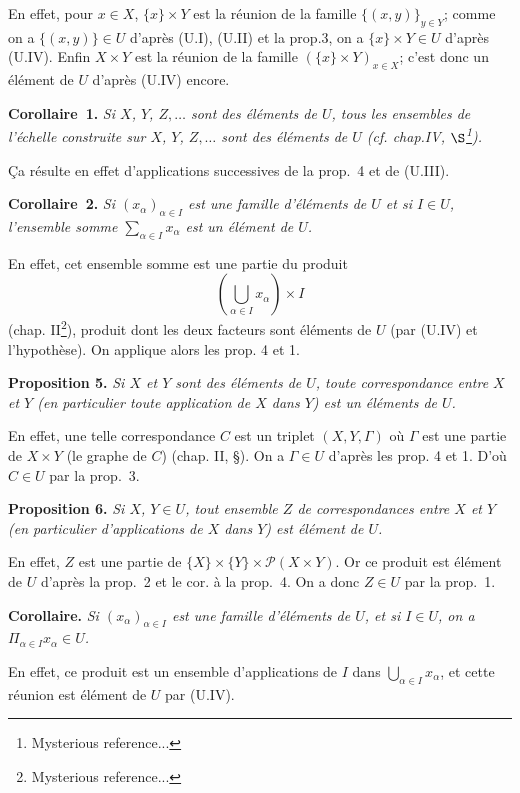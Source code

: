 \documentclass[12pt]{article}
\newcommand{\nn}{\noindent}
\begin{document}
En effet, pour $x\in X$, $\{x\}\times Y$ est la réunion de la famille $\{(x,y)\}_{y\in Y}$; comme on a $\{(x,y)\}\in U$ d'après (U.I), (U.II) et la prop.3, on a $\{x\}\times Y\in U$ d'après (U.IV). Enfin $X\times Y$ est la réunion de la famille $(\{x\}\times Y)_{x\in X}$; c'est donc un élément de $U$ d'après (U.IV) encore.

\nn\textbf{Corollaire~1.} \emph{Si $X$, $Y$, $Z,\ldots$ sont des éléments de $U$, tous les ensembles de l'échelle construite sur $X$, $Y$, $Z,\ldots$ sont des éléments de $U$ (cf. chap.IV, $\S$\footnote{Mysterious reference...}).}

Ça résulte en effet d'applications successives de la prop.~4 et de (U.III).

\nn\textbf{Corollaire~2.} \emph{Si $(x_{\alpha})_{\alpha \in I}$ est une famille d'éléments de $U$ et si $I\in U$, l'ensemble somme $\sum_{\alpha \in I}x_{\alpha}$ est un élément de $U$.}

En effet, cet ensemble somme est une partie du produit 
$$
\left(\bigcup_{\alpha\in I} x_{\alpha}\right)\times I
$$ 
(chap. II\footnote{Mysterious reference...}), produit dont les deux facteurs sont éléments de $U$ (par (U.IV) et l'hypothèse). On applique alors les prop. 4 et 1.

\nn\textbf{Proposition 5.} \emph{Si $X$ et $Y$ sont des éléments de $U$, toute correspondance entre $X$ et $Y$ (en particulier toute application de $X$ dans $Y$) est un éléments de $U$.}

En effet, une telle correspondance $C$ est un triplet $(X,Y,\Gamma)$ où $\Gamma$ est une partie de $X\times Y$ (le graphe de $C$) (chap. II, \S). On a $\Gamma\in U$ d'après les prop. 4 et 1. D'où $C\in U$ par la prop.~3.

\nn\textbf{Proposition 6.} \emph{Si $X$, $Y\in U$, tout ensemble $Z$ de correspondances entre $X$ et $Y$ (en particulier d'applications de $X$ dans $Y$) est élément de $U$.}

En effet, $Z$ est une partie de $\{X\}\times\{Y\}\times\mathcal{P}(X\times Y)$. Or ce produit est élément de $U$ d'après la prop.~2 et le cor. à la prop.~4. On a donc $Z\in U$ par la prop.~1.

\nn\textbf{Corollaire.} \emph{Si $(x_{\alpha})_{\alpha \in I}$ est une famille d'éléments de $U$, et si $I\in U$, on a $\Pi_{\alpha\in I}x_{\alpha} \in U$.}

En effet, ce produit est un ensemble d'applications de $I$ dans $\bigcup_{\alpha\in I}x_{\alpha}$, et cette réunion est élément de $U$ par (U.IV).
\end{document}
